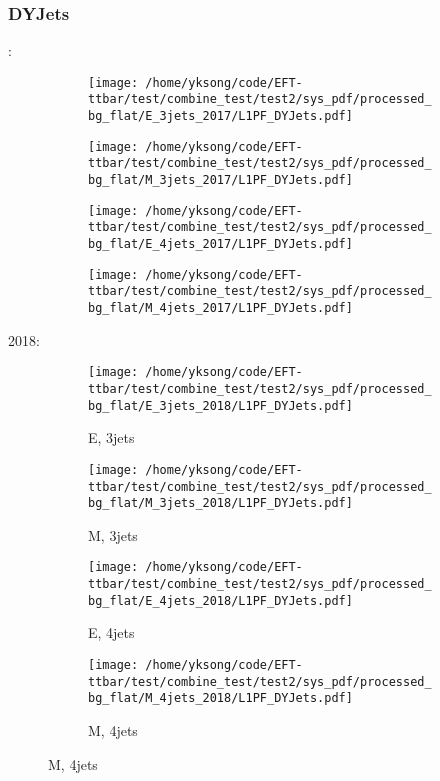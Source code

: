 \documentclass{beamer}
\begin{document}
\begin{frame}
\frametitle{DYJets}
\fontsize{5}{1}:
\begin{figure}
\centering
\begin{subfigure}[b]{0.24\textwidth}
\texttt{[image: /home/yksong/code/EFT-ttbar/test/combine\_test/test2/sys\_pdf/processed\_bg\_flat/E\_3jets\_2017/L1PF\_DYJets.pdf]}
\end{subfigure}
\begin{subfigure}[b]{0.24\textwidth}
\texttt{[image: /home/yksong/code/EFT-ttbar/test/combine\_test/test2/sys\_pdf/processed\_bg\_flat/M\_3jets\_2017/L1PF\_DYJets.pdf]}
\end{subfigure}
\begin{subfigure}[b]{0.24\textwidth}
\texttt{[image: /home/yksong/code/EFT-ttbar/test/combine\_test/test2/sys\_pdf/processed\_bg\_flat/E\_4jets\_2017/L1PF\_DYJets.pdf]}
\end{subfigure}
\begin{subfigure}[b]{0.24\textwidth}
\texttt{[image: /home/yksong/code/EFT-ttbar/test/combine\_test/test2/sys\_pdf/processed\_bg\_flat/M\_4jets\_2017/L1PF\_DYJets.pdf]}
\end{subfigure}
\end{figure}
2018:
\begin{figure}
\centering
\begin{subfigure}[b]{0.24\textwidth}
\texttt{[image: /home/yksong/code/EFT-ttbar/test/combine\_test/test2/sys\_pdf/processed\_bg\_flat/E\_3jets\_2018/L1PF\_DYJets.pdf]}
\captionsetup{font=tiny}
\caption{E, 3jets}
\end{subfigure}
\begin{subfigure}[b]{0.24\textwidth}
\texttt{[image: /home/yksong/code/EFT-ttbar/test/combine\_test/test2/sys\_pdf/processed\_bg\_flat/M\_3jets\_2018/L1PF\_DYJets.pdf]}
\captionsetup{font=tiny}
\caption{M, 3jets}
\end{subfigure}
\begin{subfigure}[b]{0.24\textwidth}
\texttt{[image: /home/yksong/code/EFT-ttbar/test/combine\_test/test2/sys\_pdf/processed\_bg\_flat/E\_4jets\_2018/L1PF\_DYJets.pdf]}
\captionsetup{font=tiny}
\caption{E, 4jets}
\end{subfigure}
\begin{subfigure}[b]{0.24\textwidth}
\texttt{[image: /home/yksong/code/EFT-ttbar/test/combine\_test/test2/sys\_pdf/processed\_bg\_flat/M\_4jets\_2018/L1PF\_DYJets.pdf]}
\captionsetup{font=tiny}
\caption{M, 4jets}
\end{subfigure}
\end{figure}
\end{frame}
\end{document}
